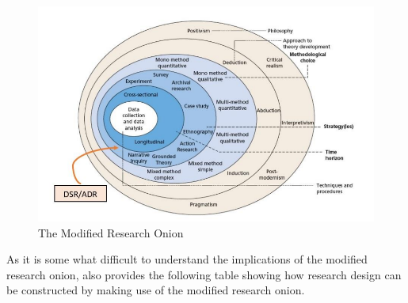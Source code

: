 \clearpage
\begin{figure}[h!]
    \centering
    \includegraphics[width=1\linewidth]{img/Modified research Onion.png}
    \caption{The Modified Research Onion}
    \label{fig:enter-label}
\end{figure}
\par{As it is some what difficult to understand the implications of the modified research onion, \cite{mardiana2020modifying} also provides the following table showing how research design can be constructed by making use of the modified research onion.}
